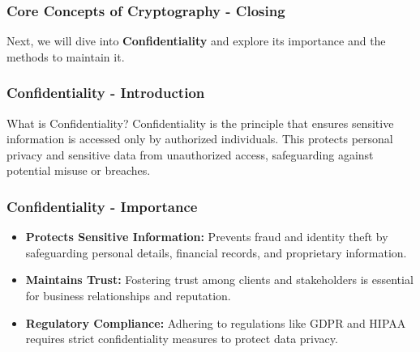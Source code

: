 \documentclass{beamer}
\begin{document}
\begin{frame}[fragile]
    \frametitle{Core Concepts of Cryptography - Closing}
    Next, we will dive into \textbf{Confidentiality} and explore its importance and the methods to maintain it.
\end{frame}

\begin{frame}[fragile]
    \frametitle{Confidentiality - Introduction}
    \begin{block}{What is Confidentiality?}
        Confidentiality is the principle that ensures sensitive information is accessed only by authorized individuals. This protects personal privacy and sensitive data from unauthorized access, safeguarding against potential misuse or breaches.
    \end{block}
\end{frame}

\begin{frame}[fragile]
    \frametitle{Confidentiality - Importance}
    \begin{itemize}
        \item \textbf{Protects Sensitive Information:} Prevents fraud and identity theft by safeguarding personal details, financial records, and proprietary information.
        
        \item \textbf{Maintains Trust:} Fostering trust among clients and stakeholders is essential for business relationships and reputation.
        
        \item \textbf{Regulatory Compliance:} Adhering to regulations like GDPR and HIPAA requires strict confidentiality measures to protect data privacy.
    \end{itemize}
\end{frame}
\end{document}
